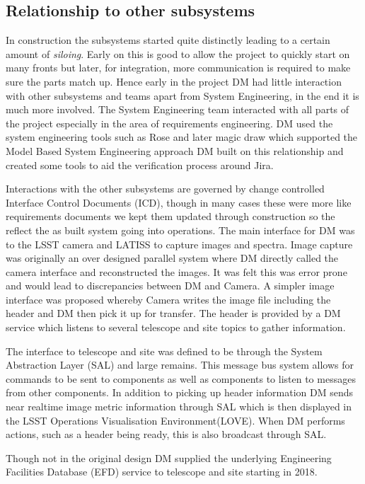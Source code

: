 \subsection{Relationship to other subsystems}
In construction the subsystems started quite distinctly leading to a certain amount of \emph{siloing}.
Early on this is good to allow the project to quickly start on many fronts but later, for integration, more communication is required to make sure the parts match up.
Hence early in the project DM had little interaction with other subsystems and teams apart from System Engineering, in the end it is much more involved.
The System Engineering team interacted with all parts of the project especially in the area of requirements engineering.
DM used the system engineering tools such as Rose and later magic draw which supported the Model Based System Engineering approach \cite{2014SPIE.9150E..0MC}
DM built on this relationship and created some tools to aid the verification process around Jira.

Interactions with the other subsystems are governed by change controlled  Interface Control Documents (ICD), though in many cases these were more like requirements documents we kept them updated through construction so the reflect the as built system going into operations.
The main interface for DM was to the LSST camera \citep{2010SPIE.7735E..0JK} and LATISS \citep{2020SPIE11452E..0UI} to capture images and spectra.
Image capture was originally an over designed parallel system where DM directly called the camera interface and reconstructed the images.
It was felt this was error prone and would lead to discrepancies between DM and Camera.
A simpler image interface was proposed \citep{DMTN-143}  whereby Camera writes the image file including the header and DM then pick it up for transfer.
The header is provided by a DM service which listens to several telescope and site topics to gather information.

The interface to telescope and site was defined to be through the System Abstraction Layer (SAL) and large remains.
This message bus system allows for commands to be sent to components as well as components to listen to messages from other components.
In addition to picking up header information DM sends near realtime image metric information through SAL which is then displayed in the LSST Operations Visualisation Environment(LOVE).
When DM performs actions, such as a header being ready, this is also broadcast through SAL.

Though not in the original design DM supplied the underlying Engineering Facilities Database (EFD) service to telescope and site starting in 2018.


